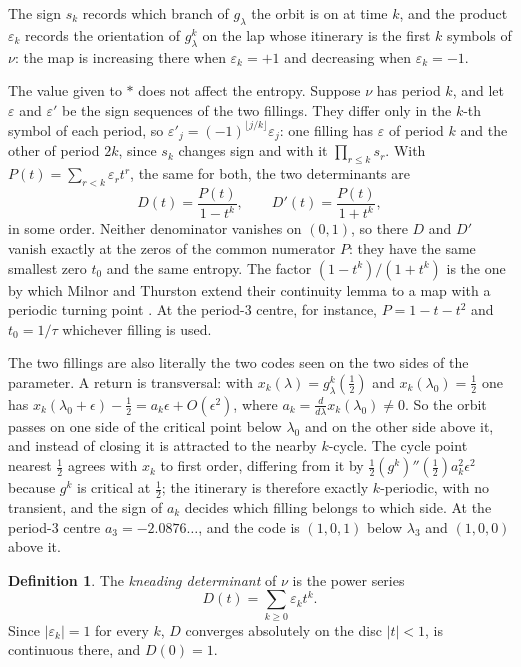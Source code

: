 \documentclass[11pt]{article}
\theoremstyle{plain}
\theoremstyle{definition}
\newtheorem{definition}[theorem]{Definition}
\newcommand{\eps}{\varepsilon}
\begin{document}
The sign $s_k$ records which branch of $g_\lambda$ the orbit is on at time $k$, and the
product $\eps_k$ records the orientation of $g_\lambda^k$ on the lap whose itinerary is the
first $k$ symbols of $\nu$: the map is increasing there when $\eps_k=+1$ and decreasing
when $\eps_k=-1$.

The value given to $*$ does not affect the entropy.  Suppose $\nu$ has period $k$, and let
$\eps$ and $\eps'$ be the sign sequences of the two fillings.  They differ only in the
$k$-th symbol of each period, so $\eps'_j=(-1)^{\lfloor j/k\rfloor}\eps_j$: one filling has
$\eps$ of period $k$ and the other of period $2k$, since $s_k$ changes sign and with it
$\prod_{r\le k}s_r$.  With $P(t)=\sum_{r<k}\eps_rt^r$, the same for both, the two
determinants are
\begin{equation}\label{eq:fillings}
  D(t)=\frac{P(t)}{1-t^k},\qquad D'(t)=\frac{P(t)}{1+t^k},
\end{equation}
in some order.  Neither denominator vanishes on $(0,1)$, so there $D$ and $D'$ vanish
exactly at the zeros of the common numerator $P$: they have the same smallest zero $t_0$ and
the same entropy.  The factor $(1-t^k)/(1+t^k)$ is the one by which Milnor and Thurston
extend their continuity lemma to a map with a periodic turning point \cite[Lemma 12.3]{MT}.
At the period-$3$ centre, for instance, $P=1-t-t^2$ and $t_0=1/\tau$ whichever filling is
used.

The two fillings are also literally the two codes seen on the two sides of the parameter.  A
return is transversal: with $x_k(\lambda)=g_\lambda^k(\tfrac12)$ and
$x_k(\lambda_0)=\tfrac12$ one has
$x_k(\lambda_0+\epsilon)-\tfrac12=a_k\epsilon+O(\epsilon^2)$, where
$a_k=\frac{d}{d\lambda}x_k(\lambda_0)\neq0$.  So the orbit passes on one side of the critical
point below $\lambda_0$ and on the other side above it, and instead of closing it is
attracted to the nearby $k$-cycle.  The cycle point nearest $\tfrac12$ agrees with $x_k$ to
first order, differing from it by $\tfrac12(g^k)''(\tfrac12)a_k^2\epsilon^2$ because $g^k$ is
critical at $\tfrac12$; the itinerary is therefore exactly $k$-periodic, with no transient,
and the sign of $a_k$ decides which filling belongs to which side.  At the period-$3$ centre
$a_3=-2.0876\ldots$, and the code is $(1,0,1)$ below $\lambda_3$ and $(1,0,0)$ above it.

\begin{definition}\label{def:D}
The \emph{kneading determinant} of $\nu$ is the power series
\begin{equation}\label{eq:D}
  D(t)=\sum_{k\ge0}\eps_k t^k .
\end{equation}
Since $|\eps_k|=1$ for every $k$, $D$ converges absolutely on the disc $|t|<1$, is
continuous there, and $D(0)=1$.
\end{definition}
\end{document}
